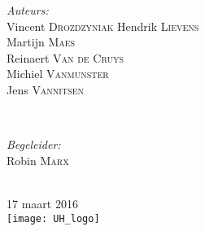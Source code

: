 \begin{titlepage}
\begin{minipage}{0.4\textwidth}
\begin{flushleft} \large
\emph{Auteurs:}\\
Vincent \textsc{Drozdzyniak} %
Hendrik \textsc{Lievens} \\ 
Martijn \textsc{Maes} \\
Reinaert \textsc{Van de Cruys} \\
Michiel \textsc{Vanmunster} \\
Jens \textsc{Vannitsen}
\end{flushleft}
\end{minipage}
~
\begin{minipage}{0.4\textwidth}
\begin{flushright} \large
\emph{Begeleider:} \\
Robin \textsc{Marx}
\end{flushright}
\end{minipage}\\[2.5cm]




{\large 17 maart 2016}\\[2cm] %


\texttt{[image: UH\_logo]}\\[2cm] %
 

\vfill %

\end{titlepage}